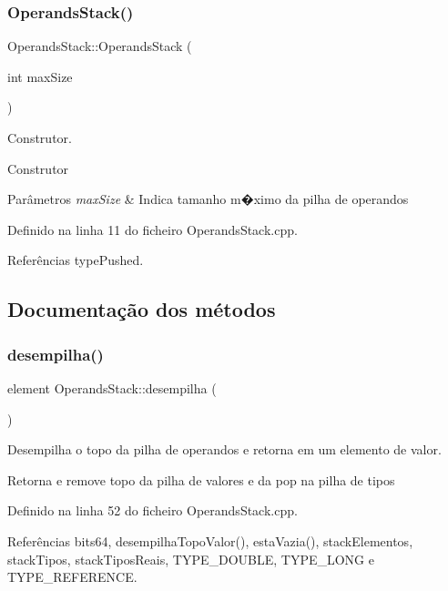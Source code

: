 \subsubsection{\texorpdfstring{Operands\+Stack()}{OperandsStack()}}
{\footnotesize\ttfamily Operands\+Stack\+::\+Operands\+Stack (\begin{DoxyParamCaption}\item[{int}]{max\+Size }\end{DoxyParamCaption})}



Construtor. 

Construtor


\begin{DoxyParams}{Parâmetros}
{\em max\+Size} & Indica tamanho m�ximo da pilha de operandos \\
\hline
\end{DoxyParams}


Definido na linha 11 do ficheiro Operands\+Stack.\+cpp.



Referências type\+Pushed.



\subsection{Documentação dos métodos}
\mbox{\label{classOperandsStack_a3213a1b633149de9332217d403ee84b6}} 
\subsubsection{\texorpdfstring{desempilha()}{desempilha()}}
{\footnotesize\ttfamily element Operands\+Stack\+::desempilha (\begin{DoxyParamCaption}{ }\end{DoxyParamCaption})}



Desempilha o topo da pilha de operandos e retorna em um elemento de valor. 

Retorna e remove topo da pilha de valores e da pop na pilha de tipos 

Definido na linha 52 do ficheiro Operands\+Stack.\+cpp.



Referências bits64, desempilha\+Topo\+Valor(), esta\+Vazia(), stack\+Elementos, stack\+Tipos, stack\+Tipos\+Reais, T\+Y\+P\+E\+\_\+\+D\+O\+U\+B\+LE, T\+Y\+P\+E\+\_\+\+L\+O\+NG e T\+Y\+P\+E\+\_\+\+R\+E\+F\+E\+R\+E\+N\+CE.



